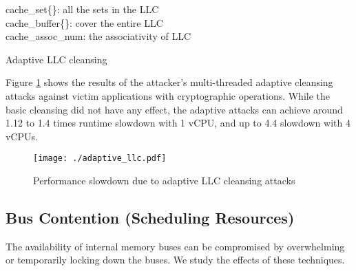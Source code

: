 \documentclass{sig-alternate}
\begin{document}
\begin{algorithm}[t]
\scriptsize
\SetAlgoLined
 \KwIn{}
 \Indp 
   cache\_set\{\}: all the sets in the LLC \\
         cache\_buffer\{\}: cover the entire LLC \\
         cache\_assoc\_num: the associativity of LLC \\
\Indm
{}
 \caption{Adaptive LLC cleansing}
\label{alg:algorithm2}
\end{algorithm}

Figure \ref{fig:adaptive_llc} shows the results of the attacker's multi-threaded 
adaptive cleansing attacks against victim applications with cryptographic operations. 
While the basic cleansing did not have any effect, the adaptive attacks can achieve 
around 1.12 to 1.4 times runtime slowdown with 1 vCPU, and up to 4.4 slowdown 
with 4 vCPUs.

\begin{figure}[ht]
\centerline{\mbox{\texttt{[image: ./adaptive\_llc.pdf]}} }
\caption{Performance slowdown due to adaptive LLC cleansing attacks}
\label{fig:adaptive_llc}
\end{figure}


\subsection{Bus Contention (Scheduling Resources)}
\label{sec:bus_contention}

The availability of internal memory buses can be compromised by overwhelming or temporarily locking down the buses. We study the effects of these techniques. 
\end{document}
